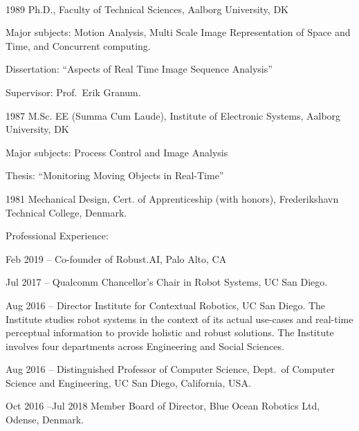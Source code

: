 \documentclass{article}
\newenvironment{sublist}{%
  \begin{list}{}{%
      \setlength{\itemsep}{0em}\setlength{\parsep}{0em}%
      \setlength{\topsep}{0em}\setlength{\parskip}{0em}%
    }%
}%
{ \end{list} }
\begin{document}
\begin{cv}
	\begin{cvlist}{~}
		\item[1989] Ph.D., Faculty of Technical Sciences, Aalborg
		University, DK
		\begin{sublist}
			\item Major subjects: Motion Analysis, Multi Scale Image
			Representation of Space and Time, and Concurrent computing.
			\item Dissertation: ``Aspects of Real Time Image Sequence Analysis''
			\item Supervisor: Prof.\ Erik Granum.
		\end{sublist}
		\item[1987] M.Sc. EE (Summa Cum Laude), Institute of Electronic
		Systems, Aalborg University, DK
		\begin{sublist}
			\item Major subjects: Process Control and Image Analysis
			\item Thesis: ``Monitoring Moving Objects in Real-Time''
		\end{sublist}
		\item[1981] Mechanical Design, Cert.
		of Apprenticeship (with honors), Frederikshavn Technical
		College, Denmark.
	\end{cvlist}



	\begin{cvlist}{Professional Experience:}


		\item[Feb 2019 --] Co-founder of Robust.AI, Palo Alto, CA

		\item[Jul 2017 --] Qualcomm Chancellor's Chair in Robot Systems, UC San Diego.

		\item[Aug 2016 --] Director Institute for Contextual Robotics, UC San
		Diego. The Institute studies robot systems in the context of its
		actual use-cases and real-time perceptual information to provide
		holistic and robust solutions. The Institute involves four
		departments across Engineering and Social Sciences.

		\item[Aug 2016 --] Distinguished Professor of Computer Science, Dept.\ of
		Computer Science and Engineering, UC San Diego, California, USA.\@

		\item[Oct 2016 --Jul 2018] Member Board of Director, Blue Ocean Robotics Ltd,
		Odense, Denmark.


\end{cvlist}
\end{cv}
\end{document}
